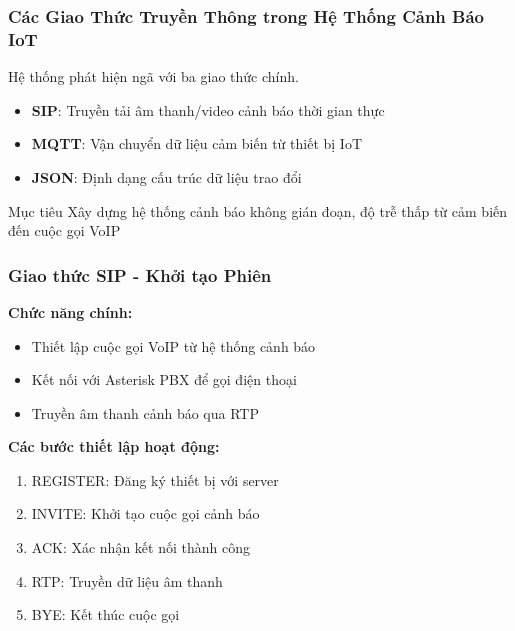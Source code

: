 
\begin{frame}
\frametitle{Các Giao Thức Truyền Thông trong Hệ Thống Cảnh Báo IoT}
\begin{center}
\Large Hệ thống phát hiện ngã với ba giao thức chính. 
\end{center}

\begin{itemize}
\item \textbf{SIP}: Truyền tải âm thanh/video cảnh báo thời gian thực
\item \textbf{MQTT}: Vận chuyển dữ liệu cảm biến từ thiết bị IoT  
\item \textbf{JSON}: Định dạng cấu trúc dữ liệu trao đổi
\end{itemize}

\begin{block}{Mục tiêu}
Xây dựng hệ thống cảnh báo không gián đoạn, độ trễ thấp từ cảm biến đến cuộc gọi VoIP
\end{block}
\end{frame}

\begin{frame}
\frametitle{Giao thức SIP - Khởi tạo Phiên}
\textbf{Chức năng chính:}
\begin{itemize}
\item Thiết lập cuộc gọi VoIP từ hệ thống cảnh báo
\item Kết nối với Asterisk PBX để gọi điện thoại
\item Truyền âm thanh cảnh báo qua RTP
\end{itemize}
\textbf{Các bước thiết lập hoạt động:}
\begin{enumerate}
\item REGISTER: Đăng ký thiết bị với server
\item INVITE: Khởi tạo cuộc gọi cảnh báo
\item ACK: Xác nhận kết nối thành công
\item RTP: Truyền dữ liệu âm thanh
\item BYE: Kết thúc cuộc gọi
\end{enumerate}
\end{frame}

